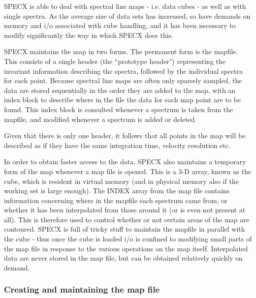 \documentclass[11pt,twoside]{report}
\begin{document}
SPECX is able to deal with spectral line maps - i.e. data cubes - as well as with single spectra. As the average size of data sets has
increased, so have demands on memory and i/o associated with cube handling, and
it has been necessary to modify significantly the way in which SPECX does this.

SPECX maintains the map in two forms. The permanent form is the mapfile.
 This consists of a single header (the ``prototype header")
 representing the invariant information describing the
spectra, followed by the individual spectra for each point. Because spectral
line maps are often only sparsely sampled, the data are stored sequentially in
the order they are added to the map, with an index block  to describe where in the file the data for each map point are to be
found. This index block is consulted whenever a spectrum is taken from the
mapfile, and modified whenever a spectrum is added or deleted.

Given that there is only one header, it follows that all points in the map will
be described as if they have the same integration time, velocity resolution
etc.

In order to obtain faster access to the data, SPECX also maintains a temporary
form of the map whenever a map file is opened. This is a 3-D array, known as
the cube, which is resident in virtual memory (and in physical
memory also if the working set is large enough). The INDEX array from the map
file contains information concerning where in the mapfile each spectrum came
from, or whether it has been interpolated  from those
around it (or is even not present at all). This is therefore used to control
whether or not certain areas of the map are contoured. SPECX is full of tricky
stuff to maintain the mapfile in parallel with the cube - thus once the cube is
loaded i/o is confined to modifying small parts of the map file in response to
the various operations on the map itself. Interpolated data are never stored in
the map file, but can be obtained relatively quickly on demand.

\subsubsection {Creating and maintaining the map file}
\end{document}
